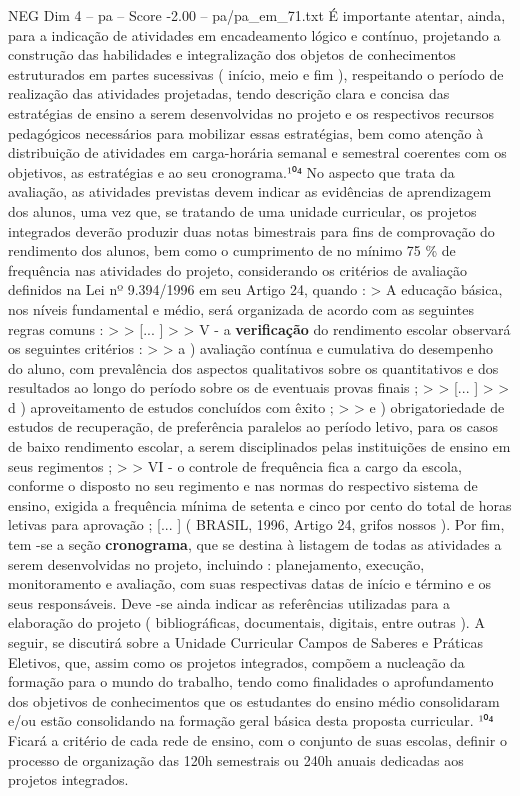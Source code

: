 \begin{textsample}{NEG Dim 4 – pa – Score -2.00 – pa/pa\_em\_71.txt}
É importante atentar, ainda, para a indicação de atividades em encadeamento lógico e contínuo, projetando a construção das habilidades e integralização dos objetos de conhecimentos estruturados em partes sucessivas ( início, meio e fim ), respeitando o período de realização das atividades projetadas, tendo descrição clara e concisa das estratégias de ensino a serem desenvolvidas no projeto e os respectivos recursos pedagógicos necessários para mobilizar essas estratégias, bem como atenção à distribuição de atividades em carga-horária semanal e semestral coerentes com os objetivos, as estratégias e ao seu cronograma.¹⁰⁴ No aspecto que trata da avaliação, as atividades previstas devem indicar as evidências de aprendizagem dos alunos, uma vez que, se tratando de uma unidade curricular, os projetos integrados deverão produzir duas notas bimestrais para fins de comprovação do rendimento dos alunos, bem como o cumprimento de no mínimo 75 \% de frequência nas atividades do projeto, considerando os critérios de avaliação definidos na Lei nº 9.394/1996 em seu Artigo 24, quando : > A educação básica, nos níveis fundamental e médio, será organizada de acordo com as seguintes regras comuns : > > [... ] > > V - a \textbf{verificação} do rendimento escolar observará os seguintes critérios : > > a ) avaliação contínua e cumulativa do desempenho do aluno, com prevalência dos aspectos qualitativos sobre os quantitativos e dos resultados ao longo do período sobre os de eventuais provas finais ; > > [... ] > > d ) aproveitamento de estudos concluídos com êxito ; > > e ) obrigatoriedade de estudos de recuperação, de preferência paralelos ao período letivo, para os casos de baixo rendimento escolar, a serem disciplinados pelas instituições de ensino em seus regimentos ; > > VI - o controle de frequência fica a cargo da escola, conforme o disposto no seu regimento e nas normas do respectivo sistema de ensino, exigida a frequência mínima de setenta e cinco por cento do total de horas letivas para aprovação ; [... ] ( BRASIL, 1996, Artigo 24, grifos nossos ).
Por fim, tem -se a seção \textbf{cronograma}, que se destina à listagem de todas as atividades a serem desenvolvidas no projeto, incluindo : planejamento, execução, monitoramento e avaliação, com suas respectivas datas de início e término e os seus responsáveis.
Deve -se ainda indicar as referências utilizadas para a elaboração do projeto ( bibliográficas, documentais, digitais, entre outras ).
A seguir, se discutirá sobre a Unidade Curricular Campos de Saberes e Práticas Eletivos, que, assim como os projetos integrados, compõem a nucleação da formação para o mundo do trabalho, tendo como finalidades o aprofundamento dos objetivos de conhecimentos que os estudantes do ensino médio consolidaram e/ou estão consolidando na formação geral básica desta proposta curricular. ¹⁰⁴ Ficará a critério de cada rede de ensino, com o conjunto de suas escolas, definir o processo de organização das 120h semestrais ou 240h anuais dedicadas aos projetos integrados.

\end{textsample}
